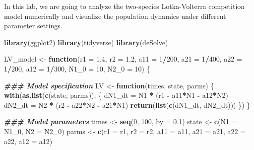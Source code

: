 \documentclass[
]{book}
\newenvironment{Shaded}{\begin{snugshade}}{\end{snugshade}}
\newcommand{\AttributeTok}[1]{\textcolor[rgb]{0.13,0.29,0.53}{#1}}
\newcommand{\ControlFlowTok}[1]{\textcolor[rgb]{0.13,0.29,0.53}{\textbf{#1}}}
\newcommand{\DecValTok}[1]{\textcolor[rgb]{0.00,0.00,0.81}{#1}}
\newcommand{\DocumentationTok}[1]{\textcolor[rgb]{0.56,0.35,0.01}{\textbf{\textit{#1}}}}
\newcommand{\FloatTok}[1]{\textcolor[rgb]{0.00,0.00,0.81}{#1}}
\newcommand{\FunctionTok}[1]{\textcolor[rgb]{0.13,0.29,0.53}{\textbf{#1}}}
\newcommand{\NormalTok}[1]{#1}
\newcommand{\OtherTok}[1]{\textcolor[rgb]{0.56,0.35,0.01}{#1}}
\newcommand{\SpecialCharTok}[1]{\textcolor[rgb]{0.81,0.36,0.00}{\textbf{#1}}}
\begin{document}
In this lab, we are going to analyze the two-species Lotka-Volterra competition model numerically and visualize the population dynamics under different parameter settings.

\begin{Shaded}
\begin{Highlighting}[]
\FunctionTok{library}\NormalTok{(ggplot2)}
\FunctionTok{library}\NormalTok{(tidyverse)}
\FunctionTok{library}\NormalTok{(deSolve)}

\NormalTok{LV\_model }\OtherTok{\textless{}{-}} \ControlFlowTok{function}\NormalTok{(}\AttributeTok{r1 =} \FloatTok{1.4}\NormalTok{, }\AttributeTok{r2 =} \FloatTok{1.2}\NormalTok{, }\AttributeTok{a11 =} \DecValTok{1}\SpecialCharTok{/}\DecValTok{200}\NormalTok{, }\AttributeTok{a21 =} \DecValTok{1}\SpecialCharTok{/}\DecValTok{400}\NormalTok{, }\AttributeTok{a22 =} \DecValTok{1}\SpecialCharTok{/}\DecValTok{200}\NormalTok{, }\AttributeTok{a12 =} \DecValTok{1}\SpecialCharTok{/}\DecValTok{300}\NormalTok{, }\AttributeTok{N1\_0 =} \DecValTok{10}\NormalTok{, }\AttributeTok{N2\_0 =} \DecValTok{10}\NormalTok{) \{}

  \DocumentationTok{\#\#\# Model specification}
\NormalTok{  LV }\OtherTok{\textless{}{-}} \ControlFlowTok{function}\NormalTok{(times, state, parms) \{}
    \FunctionTok{with}\NormalTok{(}\FunctionTok{as.list}\NormalTok{(}\FunctionTok{c}\NormalTok{(state, parms)), \{}
\NormalTok{      dN1\_dt }\OtherTok{=}\NormalTok{ N1 }\SpecialCharTok{*}\NormalTok{ (r1 }\SpecialCharTok{{-}}\NormalTok{ a11}\SpecialCharTok{*}\NormalTok{N1 }\SpecialCharTok{{-}}\NormalTok{ a12}\SpecialCharTok{*}\NormalTok{N2)}
\NormalTok{      dN2\_dt }\OtherTok{=}\NormalTok{ N2 }\SpecialCharTok{*}\NormalTok{ (r2 }\SpecialCharTok{{-}}\NormalTok{ a22}\SpecialCharTok{*}\NormalTok{N2 }\SpecialCharTok{{-}}\NormalTok{ a21}\SpecialCharTok{*}\NormalTok{N1)}
      \FunctionTok{return}\NormalTok{(}\FunctionTok{list}\NormalTok{(}\FunctionTok{c}\NormalTok{(dN1\_dt, dN2\_dt)))}
\NormalTok{    \})}
\NormalTok{  \}}

  \DocumentationTok{\#\#\# Model parameters}
\NormalTok{  times }\OtherTok{\textless{}{-}} \FunctionTok{seq}\NormalTok{(}\DecValTok{0}\NormalTok{, }\DecValTok{100}\NormalTok{, }\AttributeTok{by =} \FloatTok{0.1}\NormalTok{)}
\NormalTok{  state }\OtherTok{\textless{}{-}} \FunctionTok{c}\NormalTok{(}\AttributeTok{N1 =}\NormalTok{ N1\_0, }\AttributeTok{N2 =}\NormalTok{ N2\_0)}
\NormalTok{  parms }\OtherTok{\textless{}{-}} \FunctionTok{c}\NormalTok{(}\AttributeTok{r1 =}\NormalTok{ r1, }\AttributeTok{r2 =}\NormalTok{ r2, }\AttributeTok{a11 =}\NormalTok{ a11, }\AttributeTok{a21 =}\NormalTok{ a21, }\AttributeTok{a22 =}\NormalTok{ a22, }\AttributeTok{a12 =}\NormalTok{ a12)}


\end{Highlighting}
\end{Shaded}
\end{document}
